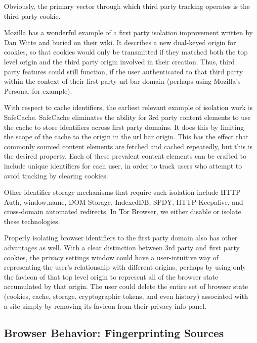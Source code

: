 \documentclass[letterpaper,11pt]{llncs}
\begin{document}
Obviously, the primary vector through which third party tracking operates is
the third party cookie. 

Mozilla has a wonderful example of a first party isolation improvement written
by Dan Witte and buried on their wiki\cite{thirdparty}. It describes a new
dual-keyed origin for cookies, so that cookies would only be transmitted if
they matched both the top level origin and the third party origin involved in
their creation. Thus, third party features could still function, if the user
authenticated to that third party within the context of their first party url
bar domain (perhaps using Mozilla's Persona, for example).

With respect to cache identifiers, the earliest relevant example of isolation
work is SafeCache\cite{safecache}. SafeCache eliminates the ability for 3rd
party content elements to use the cache to store identifiers across first
party domains. It does this by limiting the scope of the cache to the origin
in the url bar origin. This has the effect that commonly sourced content
elements are fetched and cached repeatedly, but this is the desired property.
Each of these prevalent content elements can be crafted to include unique
identifiers for each user, in order to track users who attempt to avoid
tracking by clearing cookies.

Other identifier storage mechanisms that require such isolation include
HTTP Auth, window.name, DOM Storage, IndexedDB, SPDY, HTTP-Keepalive, and
cross-domain automated redirects. In Tor Browser\cite{torbrowser}, we either
disable or isolate these technologies.

Properly isolating browser identifiers to the first party domain also has
other advantages as well. With a clear distinction between 3rd party and first
party cookies, the privacy settings window could have a user-intuitive way of
representing the user's relationship with different origins, perhaps by using
only the favicon of that top level origin to represent all of the browser
state accumulated by that origin. The user could delete the entire set of
browser state (cookies, cache, storage, cryptographic tokens, and even
history) associated with a site simply by removing its favicon from their
privacy info panel.

\subsection{Browser Behavior: Fingerprinting Sources}
\end{document}
